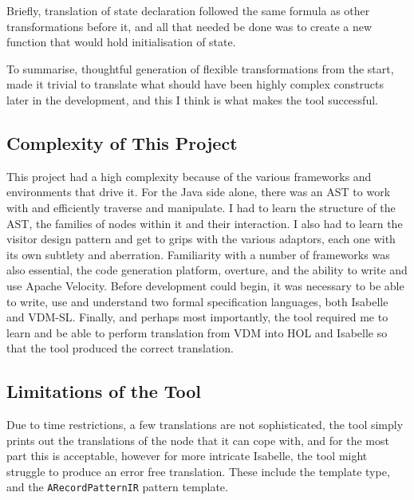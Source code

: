 Briefly, translation of state declaration followed the same formula as other transformations before it, and all that needed be done was to create a new function that would hold initialisation of state. 

To summarise, thoughtful generation of flexible transformations from the start, made it trivial to translate what should have been highly complex constructs later in the development, and this I think is what makes the tool successful.

\subsection{Complexity of This Project}
This project had a high complexity because of the various frameworks and environments that drive it.
For the Java side alone, there was an AST to work with and efficiently traverse and manipulate. I had to learn the structure of the AST, the families of nodes within it and their interaction. I also had to learn the visitor design pattern and get to grips with the various adaptors, each one with its own subtlety and aberration. Familiarity with a number of frameworks was also essential, the code generation platform, overture, and the ability to write and use Apache Velocity. Before development could begin, it was necessary to be able to write, use and understand two formal specification languages, both Isabelle and VDM-SL. Finally, and perhaps most importantly, the tool required me to learn and be able to perform translation from VDM into HOL and Isabelle so that the tool produced the correct translation.

\subsection{Limitations of the Tool} \label{lott}
Due to time restrictions, a few translations are not sophisticated, the tool simply prints out the translations of the node that it can cope with, and for the most part this is acceptable, however for more intricate Isabelle, the tool might struggle to produce an error free translation. These include the template type, and the \lstinline[language=Isabelle]{ARecordPatternIR} pattern template.

